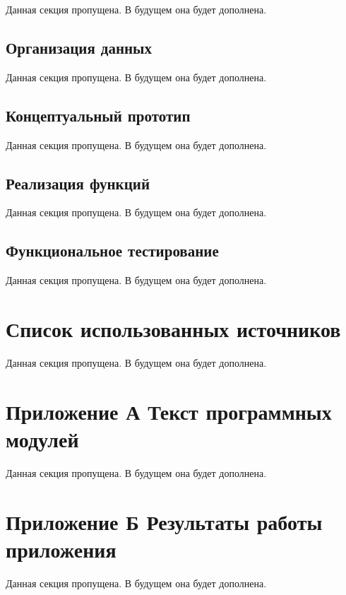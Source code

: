 \documentclass[12pt,a4paper]{article}
\begin{document}
Данная секция пропущена.
В будущем она будет дополнена.

\subsection{Организация данных}

Данная секция пропущена.
В будущем она будет дополнена.

\subsection{Концептуальный прототип}

Данная секция пропущена.
В будущем она будет дополнена.

\subsection{Реализация функций}

Данная секция пропущена.
В будущем она будет дополнена.

\subsection{Функциональное тестирование}

Данная секция пропущена.
В будущем она будет дополнена.

\newpage
\section*{Список использованных источников}

Данная секция пропущена.
В будущем она будет дополнена.

\newpage
\section*{Приложение А Текст программных модулей}

Данная секция пропущена.
В будущем она будет дополнена.

\newpage
\section*{Приложение Б Результаты работы приложения}

Данная секция пропущена.
В будущем она будет дополнена.
\end{document}
